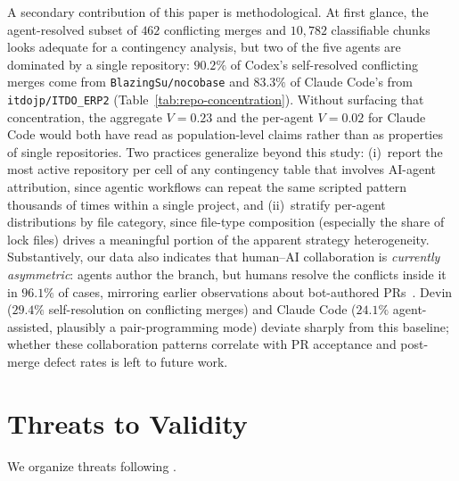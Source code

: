 \documentclass[sigconf,anonymous]{acmart}
\begin{document}
A secondary contribution of this paper is methodological. At first glance, the agent-resolved subset of $462$ conflicting merges and $10{,}782$ classifiable chunks looks adequate for a contingency analysis, but two of the five agents are dominated by a single repository: $90.2\%$ of Codex's self-resolved conflicting merges come from \texttt{BlazingSu/nocobase} and $83.3\%$ of Claude Code's from \texttt{itdojp/ITDO\_ERP2} (Table~\ref{tab:repo-concentration}). Without surfacing that concentration, the aggregate $V{=}0.23$ and the per-agent $V{=}0.02$ for Claude Code would both have read as population-level claims rather than as properties of single repositories. Two practices generalize beyond this study: (i)~report the most active repository per cell of any contingency table that involves AI-agent attribution, since agentic workflows can repeat the same scripted pattern thousands of times within a single project, and (ii)~stratify per-agent distributions by file category, since file-type composition (especially the share of lock files) drives a meaningful portion of the apparent strategy heterogeneity. Substantively, our data also indicates that human--AI collaboration is \emph{currently asymmetric}: agents author the branch, but humans resolve the conflicts inside it in $96.1\%$ of cases, mirroring earlier observations about bot-authored PRs~\cite{alfadel2021dependabot}. Devin ($29.4\%$ self-resolution on conflicting merges) and Claude Code ($24.1\%$ agent-assisted, plausibly a pair-programming mode) deviate sharply from this baseline; whether these collaboration patterns correlate with PR acceptance and post-merge defect rates is left to future work.

\section{Threats to Validity}
\label{sec:threats}

We organize threats following \citet{wohlin2012experimentation}.
\end{document}
